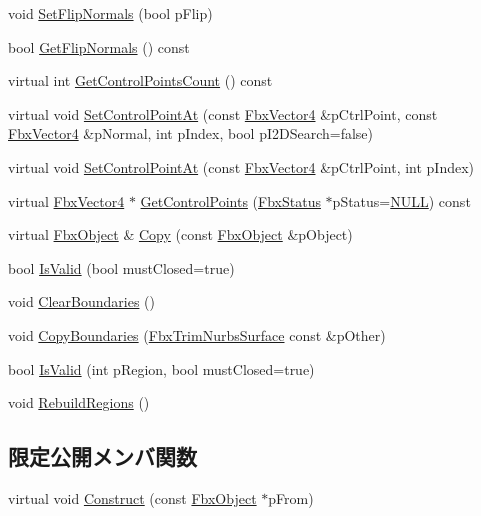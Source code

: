 \begin{DoxyCompactItemize}
\item 
void \hyperlink{class_fbx_trim_nurbs_surface_a5f73a1d5abe4f71741ddc82fb7d003c8}{Set\+Flip\+Normals} (bool p\+Flip)
\item 
bool \hyperlink{class_fbx_trim_nurbs_surface_ae8e939290c0ab69be23fa28b6c1d8cf7}{Get\+Flip\+Normals} () const
\item 
virtual int \hyperlink{class_fbx_trim_nurbs_surface_a11c7260f31786dd8ace17769d0ccb302}{Get\+Control\+Points\+Count} () const
\item 
virtual void \hyperlink{class_fbx_trim_nurbs_surface_a8a42014521b0c91eba3554ecafe56814}{Set\+Control\+Point\+At} (const \hyperlink{class_fbx_vector4}{Fbx\+Vector4} \&p\+Ctrl\+Point, const \hyperlink{class_fbx_vector4}{Fbx\+Vector4} \&p\+Normal, int p\+Index, bool p\+I2\+D\+Search=false)
\item 
virtual void \hyperlink{class_fbx_trim_nurbs_surface_acec735094f0448ab58a48baf38c0c7ef}{Set\+Control\+Point\+At} (const \hyperlink{class_fbx_vector4}{Fbx\+Vector4} \&p\+Ctrl\+Point, int p\+Index)
\item 
virtual \hyperlink{class_fbx_vector4}{Fbx\+Vector4} $\ast$ \hyperlink{class_fbx_trim_nurbs_surface_aff21dc007688399ca91da1a9c9f6e584}{Get\+Control\+Points} (\hyperlink{class_fbx_status}{Fbx\+Status} $\ast$p\+Status=\hyperlink{fbxarch_8h_a070d2ce7b6bb7e5c05602aa8c308d0c4}{N\+U\+LL}) const
\item 
virtual \hyperlink{class_fbx_object}{Fbx\+Object} \& \hyperlink{class_fbx_trim_nurbs_surface_a4407d30e83346ab3cb30ccf67d7bb289}{Copy} (const \hyperlink{class_fbx_object}{Fbx\+Object} \&p\+Object)
\item 
bool \hyperlink{class_fbx_trim_nurbs_surface_abf1cabd0b59cd6eefb780b1ae29635b4}{Is\+Valid} (bool must\+Closed=true)
\item 
void \hyperlink{class_fbx_trim_nurbs_surface_a9b06224c2a2f1601a88a3e26f6060cab}{Clear\+Boundaries} ()
\item 
void \hyperlink{class_fbx_trim_nurbs_surface_a7d8f23447e1286c7d8476ece0561c923}{Copy\+Boundaries} (\hyperlink{class_fbx_trim_nurbs_surface}{Fbx\+Trim\+Nurbs\+Surface} const \&p\+Other)
\item 
bool \hyperlink{class_fbx_trim_nurbs_surface_aef8d884e0cf1369ea7dc01e2782f7571}{Is\+Valid} (int p\+Region, bool must\+Closed=true)
\item 
void \hyperlink{class_fbx_trim_nurbs_surface_ac233fb1ab17ead3b67615553b4b02165}{Rebuild\+Regions} ()
\end{DoxyCompactItemize}
\subsection*{限定公開メンバ関数}
\begin{DoxyCompactItemize}
\item 
virtual void \hyperlink{class_fbx_trim_nurbs_surface_a95ea54578a57e9038ae67cb2b6b26f82}{Construct} (const \hyperlink{class_fbx_object}{Fbx\+Object} $\ast$p\+From)
\end{DoxyCompactItemize}
